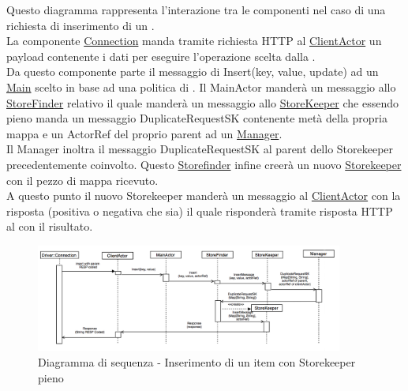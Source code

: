 \documentclass{scalatekids-article}
\begin{document}
Questo diagramma rappresenta l'interazione tra le componenti nel caso di una richiesta di inserimento di un .\\
La componente \hyperref[sec:actorbase::driver::client::Connection]{Connection}
manda tramite richiesta HTTP al \hyperref[sec:actorbase::actorsystem::clientactor::ClientActor]{ClientActor}
un payload contenente i dati per eseguire l'operazione scelta dalla .\\
Da questo componente parte il messaggio di Insert(key, value, update) ad un \hyperref[sec:actorbase::actorsystem::main::Main]{Main} scelto in base
ad una politica di .
Il MainActor manderà un messaggio allo \hyperref[sec:actorbase::actorsystem::storefinder::StoreFinder]{StoreFinder} relativo il quale manderà
un messaggio allo \hyperref[sec:actorbase::actorsystem::storekeeper::StoreKeeper]{StoreKeeper} che essendo pieno manda un
messaggio DuplicateRequestSK contenente metà della propria mappa e un ActorRef del proprio parent ad un
\hyperref[sec:actorbase::actorsystem::manager::Manager]{Manager}.\\
Il Manager inoltra il messaggio DuplicateRequestSK al parent dello Storekeeper precedentemente coinvolto.
Questo \hyperref[sec:actorbase::actorsystem::storefinder::Storefinder]{Storefinder} infine creerà un nuovo
\hyperref[sec:actorbase::actorsystem::storekeeper::Storekeeper]{Storekeeper} con il pezzo di mappa ricevuto.\\
A questo punto il nuovo Storekeeper manderà un messaggio al \hyperref[sec:actorbase::actorsystem::clientactor::ClientActor]{ClientActor} con
la risposta (positiva o negativa che sia) il quale risponderà tramite risposta HTTP al  con il risultato.
\begin{figure}[H]
  \begin{center}
    \includegraphics[width=0.9\textwidth, keepaspectratio]{img/diagrammiSequenza/esempioInsertFull.png}
    \caption{Diagramma di sequenza - Inserimento di un item con Storekeeper pieno}
  \end{center}
\end{figure}
\end{document}
